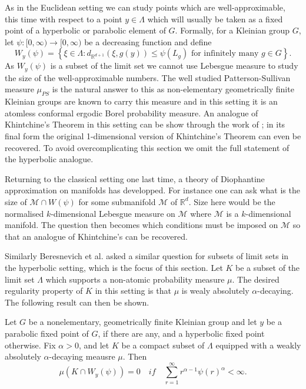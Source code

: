 As in the Euclidean setting we can study points which are well-approximable, this time with respect to a point $y \in \Lambda$ which will usually be taken as a fixed point of a hyperbolic or parabolic element of $G$. Formally, for a Kleinian group $G$, let $\psi \colon [0,\infty) \rightarrow [0,\infty)$ be a decreasing function and define
\[
W_y(\psi) = \left\{ \xi \in \Lambda \colon d_{\mathbb{R}^{d+1}}(\xi, g(y)) \le \psi(L_g) \text{ for infinitely many } g \in G \right\}.
\]
As $W_y(\psi)$ is a subset of the limit set we cannot use Lebesgue measure to study the size of the well-approximable numbers. The well studied Patterson-Sullivan measure $\mu_{PS}$ is the natural answer to this as non-elementary geometrically finite Kleinian groups are known to carry this measure and in this setting it is an atomless conformal ergodic Borel probability measure. An analogue of Khintchine's Theorem in this setting can be show through the work of \cite{patterson, stratmann, stratmann-velani, beres-dick-velani}; in its final form the original 1-dimensional version of Khintchine's Theorem can even be recovered. To avoid overcomplicating this section we omit the full statement of the hyperbolic analogue.

Returning to the classical setting one last time, a theory of Diophantine approximation on manifolds has developped. For instance one can ask what is the size of $\mathcal{M} \cap W(\psi)$ for some submanifold $\mathcal{M}$ of $\mathbb{R}^d$. Size here would be the normalised $k$-dimensional Lebesgue measure on $\mathcal{M}$ where $\mathcal{M}$ is a $k$-dimensional manifold. The question then becomes which conditions must be imposed on $\mathcal{M}$ so that an analogue of Khintchine's can be recovered.

Similarly Beresnevich et al. \cite{beres-sanju-al} asked a similar question for subsets of limit sets in the hyperbolic setting, which is the focus of this section. Let $K$ be a subset of the limit set $\Lambda$ which supports a non-atomic probability measure $\mu$. The desired regularity property of $K$ in this setting is that $\mu$ is wealy absolutely $\alpha$-decaying. The following result can then be shown.

\begin{theorem}
	Let $G$ be a nonelementary, geometrically finite Kleinian group and let $y$ be a parabolic fixed point of $G$, if there are any, and a hyperbolic fixed point otherwise. Fix $\alpha > 0$, and let $K$ be a compact subset of $\Lambda$ equipped with a weakly absolutely $\alpha$-decaying meausre $\mu$. Then
	\[
	\mu(K\cap W_y(\psi)) = 0 \quad if \quad \sum_{r=1}^\infty r^{\alpha-1} \psi(r)^{\alpha} < \infty.
	\]
\end{theorem}

